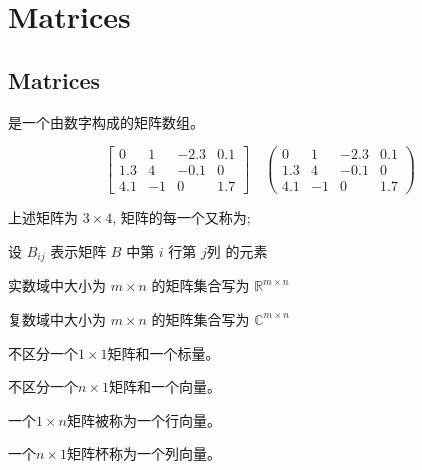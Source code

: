 \chapter{Matrices}

\section{Matrices}

\begin{definition}[矩阵]
    是一个由数字构成的矩阵数组。 

    \begin{equation} \left[\begin{array}{cccc}0 & 1 & -2.3 & 0.1 \\ 1.3 & 4 & -0.1 & 0 \\ 4.1 & -1 & 0 & 1.7\end{array}\right] \quad  \left(\begin{array}{cccc}0 & 1 & -2.3 & 0.1 \\ 1.3 & 4 & -0.1 & 0 \\ 4.1 & -1 & 0 & 1.7\end{array}\right)  \end{equation}

    上述矩阵为 $3\times 4$, 矩阵的每一个又称为;
\end{definition}

\begin{notation}
    设 $ B_{i j} $ 表示矩阵 $ B $ 中第 $ i $ 行第 $ j $列 的元素

    实数域中大小为 $ m \times n $ 的矩阵集合写为 $ \mathbb{R}^{m \times n} $

    复数域中大小为 $ m \times n $ 的矩阵集合写为 $ \mathbb{C}^{m \times n} $
\end{notation}

\begin{definition}[标量]
    不区分一个$1\times 1$矩阵和一个标量。 
\end{definition}

\begin{definition}[向量]
    不区分一个$n\times 1$矩阵和一个向量。 
\end{definition}

\begin{definition}
    一个$1\times n$矩阵被称为一个行向量。 
    
    一个$n\times 1$矩阵杯称为一个列向量。 
\end{definition}


